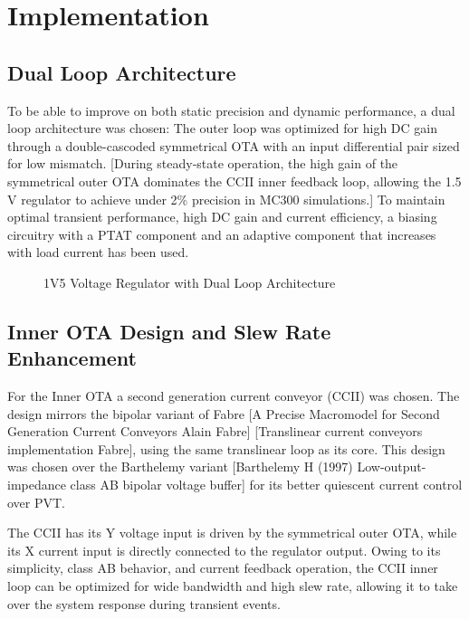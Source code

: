 \documentclass[
]{article}
\makeatletter
\let\oldsection\section
\renewcommand{\section}{\clearpage\oldsection}
\newcommand*\pandocbounded[1]{%
  \sbox\pandoc@box{#1}%
  \Gscale@div\@tempa{\textheight}{\dimexpr\ht\pandoc@box+\dp\pandoc@box\relax}%
  \Gscale@div\@tempb{\linewidth}{\wd\pandoc@box}%
  \ifdim\@tempb\p@<\@tempa\p@\let\@tempa\@tempb\fi%
  \ifdim\@tempa\p@<\p@\scalebox{\@tempa}{\usebox\pandoc@box}%
  \else\usebox{\pandoc@box}%
  \fi%
}
\makeatother
\begin{document}
\section{Implementation}\label{_implementation}

\subsection{Dual Loop Architecture}\label{_dual_loop_architecture}

To be able to improve on both static precision and dynamic performance,
a dual loop architecture was chosen: The outer loop was optimized for
high DC gain through a double-cascoded symmetrical OTA with an input
differential pair sized for low mismatch. {[}During steady‑state
operation, the high gain of the symmetrical outer OTA dominates the CCII
inner feedback loop, allowing the 1.5 V regulator to achieve under 2\%
precision in MC300 simulations.{]} To maintain optimal transient
performance, high DC gain and current efficiency, a biasing circuitry
with a PTAT component and an adaptive component that increases with load
current has been used.

\begin{figure}
\centering
\pandocbounded{}
\caption{1V5 Voltage Regulator with Dual Loop Architecture}
\end{figure}

\subsection{Inner OTA Design and Slew Rate
Enhancement}\label{_inner_ota_design_and_slew_rate_enhancement}

For the Inner OTA a second generation current conveyor (CCII) was
chosen. The design mirrors the bipolar variant of Fabre {[}A Precise
Macromodel for Second Generation Current Conveyors Alain Fabre{]}
{[}Translinear current conveyors implementation Fabre{]}, using the same
translinear loop as its core. This design was chosen over the Barthelemy
variant {[}Barthelemy H (1997) Low-output-impedance class AB bipolar
voltage buffer{]} for its better quiescent current control over PVT.

The CCII has its Y voltage input is driven by the symmetrical outer OTA,
while its X current input is directly connected to the regulator output.
Owing to its simplicity, class AB behavior, and current feedback
operation, the CCII inner loop can be optimized for wide bandwidth and
high slew rate, allowing it to take over the system response during
transient events.
\end{document}
